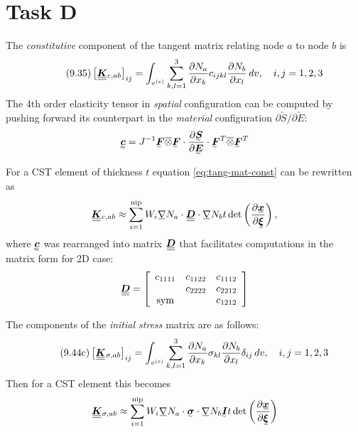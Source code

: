 \section{Task D}
\label{sec:task-d}

The \textit{constitutive} component of the tangent matrix relating node \(a\) to
node \(b\) is
\begin{equation} \tag{9.35}
  \label{eq:tang-mat-const}
  \left[ \uubar{\bm{K}}_{c,ab} \right]_{ij} =
  \int_{v^{(e)}} \sum_{k,l=1}^{3} \frac{\partial N_{a}}{\partial x_{k}}
  c_{ijkl} \frac{\partial N_{b}}{\partial x_{l}} \, dv, \quad i,j = 1,2,3
\end{equation}
The 4th order elasticity tensor in \textit{spatial} configuration can be computed
by pushing forward its counterpart in the \textit{material} configuration
\(\partial \utilde{S} / \partial \utilde{E}\):
\begin{equation}
  \label{eq:elast-tensor-Euler}
  \uutilde{c} = J^{-1} \utilde{F} \overline{\otimes} \utilde{F} \cdot
  \frac{\partial \utilde{S}}{\partial \utilde{E}} \cdot
    \utilde{F}^{T} \overline{\otimes} \utilde{F}^{T}
\end{equation}

For a CST element of thickness \(t\) equation \eqref{eq:tang-mat-const} can be
rewritten as
\begin{equation}
  \label{eq:tang-mat-const-CST}
  \uubar{\bm{K}}_{c,ab} \approx \sum_{i=1}^{\text{nip}} W_{i} \ubar{\nabla} N_{a}
  \cdot \uubar{\bm{D}} \cdot \ubar{\nabla} N_{b} t 
  \det \left( \frac{\partial \ubar{\bm{x}}}{\partial \ubar{\bm{\xi}}} \right),
\end{equation}
where \(\uutilde{c}\) was rearranged into matrix \(\uubar{\bm{D}}\) that
facilitates computations in the matrix form for 2D case:
\begin{equation}
  \label{eq:D-matrix}
  \uubar{\bm{D}} = \left[
    \begin{array}{c c c}
      c_{1111} & c_{1122} & c_{1112} \\
               & c_{2222} & c_{2212} \\
      \text{sym} &  & c_{1212}
	\end{array} \right] 
\end{equation}

The components of the \textit{initial stress} matrix are as follows:
\begin{equation} \tag{9.44c}
  \label{eq:tang-mat-init}
  \left[ \uubar{\bm{K}}_{\sigma,ab} \right]_{ij} =
  \int_{v^{(e)}} \sum_{k,l=1}^{3} \frac{\partial N_{a}}{\partial x_{k}}
  \sigma_{kl} \frac{\partial N_{b}}{\partial x_{l}} \delta_{ij} \, dv,
  \quad i,j = 1,2,3  
\end{equation}
Then for a CST element this becomes
\begin{equation}
  \label{eq:tang-mat-init-CST}
  \uubar{\bm{K}}_{\sigma,ab} \approx \sum_{i=1}^{\text{nip}} W_{i} \ubar{\nabla} N_{a}
  \cdot \utilde{\sigma} \cdot \ubar{\nabla} N_{b} \utilde{I} t 
  \det \left( \frac{\partial \ubar{\bm{x}}}{\partial \ubar{\bm{\xi}}} \right)
\end{equation}

